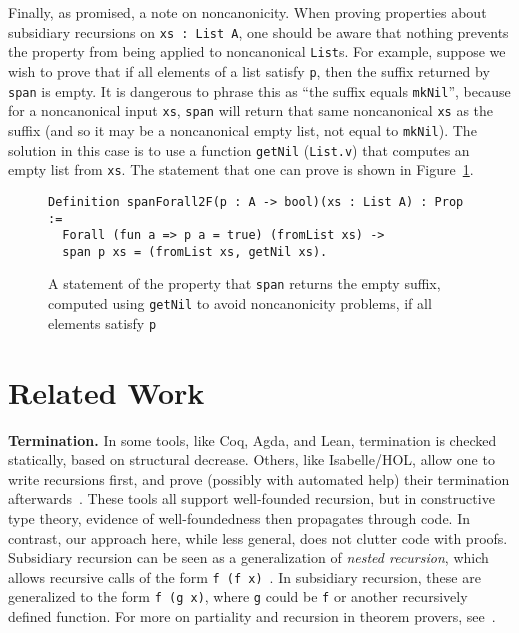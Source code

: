 \documentclass[a4paper,USenglish]{lipics-v2021}
\begin{document}
Finally, as promised, a note on noncanonicity. When proving properties about subsidiary
recursions on \verb|xs : List A|, one should be aware that nothing prevents
the property from being applied to noncanonical \verb|List|s.  For example,
suppose we wish to prove that if all elements of a  list satisfy \verb|p|, then
the suffix returned by \verb|span| is empty.  It is dangerous to phrase
this as ``the suffix equals \verb|mkNil|'', because for a noncanonical input \verb|xs|,
\verb|span| will return that same  noncanonical \verb|xs| as the suffix (and so
it may be a noncanonical empty list, not equal to \verb|mkNil|).  The solution
in this case is to use a function \verb|getNil| (\verb|List.v|) that computes
an empty list from \verb|xs|.  The statement that one can prove is shown in Figure~\ref{fig:spanforallt}.

\begin{figure}
\begin{verbatim}
Definition spanForall2F(p : A -> bool)(xs : List A) : Prop :=
  Forall (fun a => p a = true) (fromList xs) ->
  span p xs = (fromList xs, getNil xs).
\end{verbatim}
\caption{A statement of the property that \texttt{span} returns the empty suffix, computed using \texttt{getNil} to avoid noncanonicity problems, if all elements satisfy \texttt{p}}
\label{fig:spanforallt}
\end{figure}

\section{Related Work}
\label{sec:related}

\textbf{Termination.}  In some tools, like Coq, Agda, and Lean,
termination is checked statically, based on structural decrease.
Others, like Isabelle/HOL, allow one to write recursions first, and
prove (possibly with automated help) their termination
afterwards~\cite{krauss}.  These tools all support well-founded
recursion, but in constructive type theory, evidence of
well-foundedness then propagates through code.  In contrast, our
approach here, while less general, does not clutter code with proofs.
Subsidiary recursion can be seen as a generalization of \emph{nested
recursion}, which allows recursive calls of the form
\verb|f (f x)|~\cite{krauss10}.  In subsidiary recursion, these are
generalized to the form \verb|f (g x)|, where \verb|g| could be
\verb|f| or another recursively defined function.  For more on
partiality and recursion in theorem provers, see~\cite{bove+16}.
\end{document}
